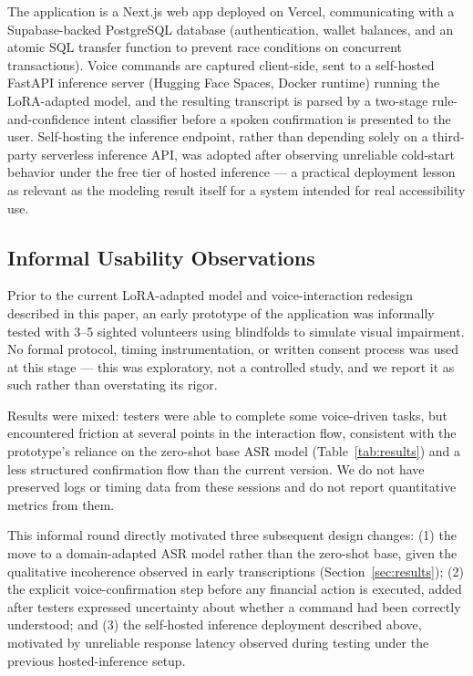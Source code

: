 \documentclass[11pt,a4paper]{article}
\begin{document}
The application is a Next.js web app deployed on Vercel, communicating with
a Supabase-backed PostgreSQL database (authentication, wallet balances, and
an atomic SQL transfer function to prevent race conditions on concurrent
transactions). Voice commands are captured client-side, sent to a
self-hosted FastAPI inference server (Hugging Face Spaces, Docker runtime)
running the LoRA-adapted model, and the resulting transcript is parsed by a
two-stage rule-and-confidence intent classifier before a spoken
confirmation is presented to the user. Self-hosting the inference endpoint,
rather than depending solely on a third-party serverless inference API,
was adopted after observing unreliable cold-start behavior under the free
tier of hosted inference --- a practical deployment lesson as relevant as
the modeling result itself for a system intended for real accessibility use.

\subsection{Informal Usability Observations}

Prior to the current LoRA-adapted model and voice-interaction redesign
described in this paper, an early prototype of the application was
informally tested with 3--5 sighted volunteers using blindfolds to
simulate visual impairment. No formal protocol, timing instrumentation,
or written consent process was used at this stage --- this was
exploratory, not a controlled study, and we report it as such rather
than overstating its rigor.

Results were mixed: testers were able to complete some voice-driven
tasks, but encountered friction at several points in the interaction
flow, consistent with the prototype's reliance on the zero-shot base
ASR model (Table~\ref{tab:results}) and a less structured confirmation
flow than the current version. We do not have preserved logs or timing
data from these sessions and do not report quantitative metrics from
them.

This informal round directly motivated three subsequent design changes:
(1) the move to a domain-adapted ASR model rather than the zero-shot
base, given the qualitative incoherence observed in early transcriptions
(Section~\ref{sec:results}); (2) the explicit voice-confirmation step
before any financial action is executed, added after testers expressed
uncertainty about whether a command had been correctly understood; and
(3) the self-hosted inference deployment described above, motivated by
unreliable response latency observed during testing under the
previous hosted-inference setup.
\end{document}
